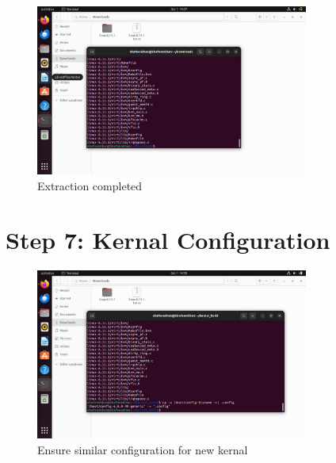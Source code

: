 \documentclass{article}
\begin{document}
\begin{figure}[H]
    \centering
    \includegraphics[width=0.8\textwidth]{69.jpg}
    \caption{Extraction completed}
\end{figure}


\section*{Step 7: Kernal Configuration}
\begin{figure}[H]
    \centering
    \includegraphics[width=0.8\textwidth]{65.jpg}
    \caption{Ensure similar configuration for new kernal}
\end{figure}
\end{document}
